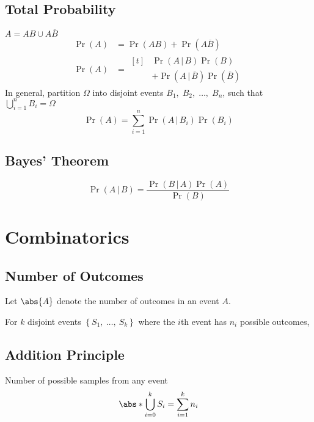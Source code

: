 \documentclass{article}
\begin{document}
\begin{multicols}{3}
    \subsection{Total Probability}
    \(A = AB \cup A\overline{B}\)
    \begin{align*}
        \Pr{\left( A \right)} & = \Pr{\left( AB \right)} + \Pr{\left( A\overline{B} \right)}                        \\
        \Pr{\left( A \right)} & = \begin{aligned}[t]
                                       & \Pr{\left( A \,\vert\, B \right)}\Pr{\left( B \right)}                         \\
                                       & + \Pr{\left( A \,\vert\, \overline{B} \right)}\Pr{\left( \overline{B} \right)}
                                  \end{aligned}
    \end{align*}
    In general, partition \(\Omega\) into disjoint events \(B_1,\; B_2,\; \dots,\; B_n\),
    such that \(\bigcup_{i=1}^n B_i = \Omega\)
    \begin{equation*}
        \Pr{\left( A \right)} = \sum_{i = 1}^n \Pr{\left( A \,\vert\, B_i \right)}\Pr{\left( B_i \right)}
    \end{equation*}
    \subsection{Bayes' Theorem}
    \begin{equation*}
        \Pr{\left( A \,\vert\, B \right)} = \frac{\Pr{\left( B \,\vert\, A \right)}\Pr{\left( A \right)}}{\Pr{\left( B \right)}}
    \end{equation*}
    \section{Combinatorics}
    \subsection{Number of Outcomes}
    Let \(\abs{A}\) denote the number of outcomes in an event \(A\).

    For \(k\) disjoint events \({\left\{ S_1,\:\ldots,\:S_k \right\}}\)
    where the \(i\)th event has \(n_i\) possible outcomes,
    \subsection{Addition Principle}
    Number of possible samples from any event
    \begin{equation*}
        \abs*{\bigcup_{i = 0}^{k} S_i} = \sum_{i = 1}^k n_i
    \end{equation*}

\end{multicols}
\end{document}

